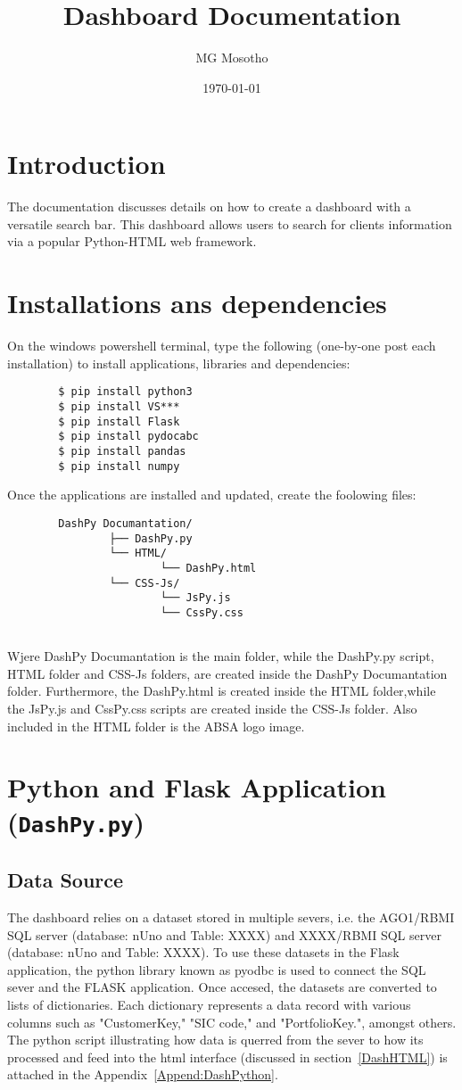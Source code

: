 \documentclass{article}
\title{ Dashboard Documentation}
\author{MG Mosotho}
\date{\today}
\begin{document}
	
	\maketitle
	
	\section{Introduction}
	The documentation discusses details on how to create a dashboard with a versatile search bar. This dashboard allows users to search for clients information via a popular Python-HTML web framework.
	
	\section{Installations ans dependencies}
	 On the windows powershell terminal, type the following (one-by-one post each installation) to install applications, libraries and dependencies:
	\begin{verbatim}
		$ pip install python3
		$ pip install VS***
		$ pip install Flask		
		$ pip install pydocabc
		$ pip install pandas	
		$ pip install numpy
	\end{verbatim}

	 Once the applications are installed and updated, create the foolowing files:
	
	\begin{verbatim}
		DashPy Documantation/
				├── DashPy.py
				└── HTML/
						└── DashPy.html
				└── CSS-Js/
						└── JsPy.js
						└── CssPy.css
				
	\end{verbatim}
		
	Wjere DashPy Documantation is the main folder, while the DashPy.py script, HTML folder and CSS-Js folders, are created inside the DashPy Documantation folder. Furthermore, the DashPy.html is created inside the HTML folder,while the JsPy.js and CssPy.css scripts are created inside the CSS-Js folder. Also included in the HTML folder is the ABSA logo image.
		
	\section{Python and Flask Application (\texttt{DashPy.py})}
	\subsection{Data Source}
	The dashboard relies on a dataset stored in multiple severs, i.e. the AGO1/RBMI SQL server (database: nUno and Table: XXXX) and XXXX/RBMI SQL server (database: nUno and Table: XXXX). To use these datasets in the Flask application, the python library known as pyodbc is used to  connect the SQL sever and the FLASK application. Once accesed, the datasets are converted to lists of dictionaries. Each dictionary represents a data record with various columns such as "CustomerKey," "SIC code," and "PortfolioKey.", amongst others. The python script illustrating how data is querred from the sever to how its processed and feed into the html interface (discussed in section~\ref{DashHTML}) is attached in the Appendix~\ref{Append:DashPython}.
	
\end{document}
